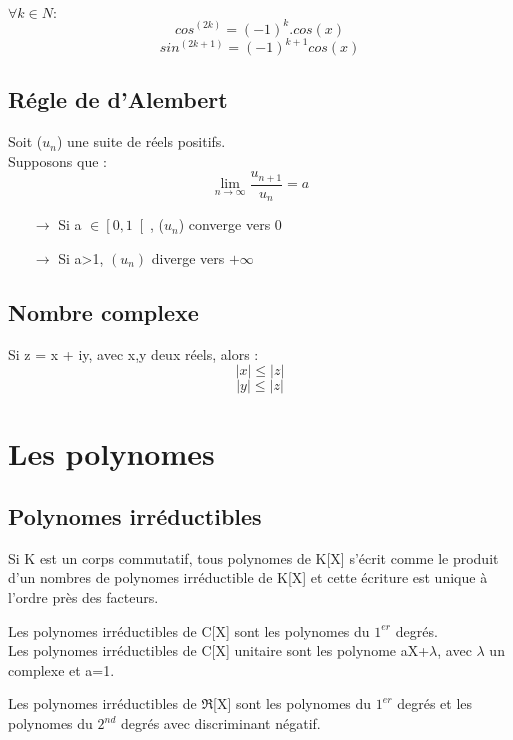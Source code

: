 \begin{prop}
$\forall k \in N : $
$$cos^{(2k)} = (-1)^k.cos(x)$$
$$sin^{(2k+1)} = (-1)^{k+1}cos(x)$$
\end{prop}
\subsection{Régle de d'Alembert}
Soit ($u_n$) une suite de réels positifs.\\
Supposons que :
$$\lim_{n \rightarrow \infty} \dfrac{u_{n+1}}{u_n} = a$$
\begin{itemize}
 \item[$\rightarrow$] Si a $\in \left[0,1\right[$, ($u_n$) converge vers 0
 \item[$\rightarrow$] Si a>1, $(u_n)$ diverge vers $+\infty$
\end{itemize}
\subsection{Nombre complexe}
\begin{prop}
Si z = x + iy, avec x,y deux réels, alors : 
$$|x| \leq |z|$$
$$|y| \leq |z|$$
\end{prop}
\section{Les polynomes}
\subsection{Polynomes irréductibles}
\begin{prop}
Si K est un corps commutatif, tous polynomes de K[X] s'écrit comme le produit d'un nombres de polynomes irréductible de K[X] et cette écriture est unique à l'ordre près des facteurs.
\end{prop}
\begin{enon}
Les polynomes irréductibles de C[X] sont les polynomes du $1^{er}$ degrés.\\
Les polynomes irréductibles de C[X] unitaire sont les polynome aX+$\lambda$, avec $\lambda$ un complexe et a=1.
\end{enon}
\begin{enon}
Les polynomes irréductibles de $\Re$[X] sont les polynomes du $1^{er}$ degrés et les polynomes du $2^{nd}$ degrés avec discriminant négatif.
\end{enon}
